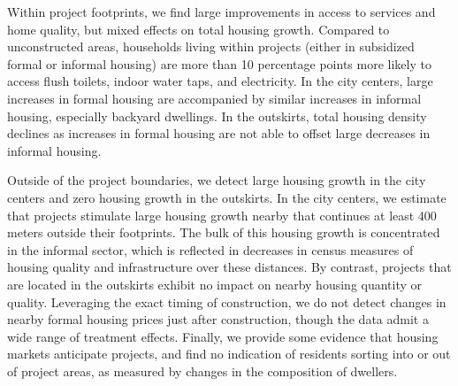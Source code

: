 \documentclass[12pt]{article}
\begin{document}



Within project footprints, we find large improvements in access to services and home quality, but mixed effects on total housing growth. Compared to unconstructed areas, households living within projects (either in subsidized formal or informal housing) are more than 10 percentage points more likely to access flush toilets, indoor water taps, and electricity.  In the city centers, large increases in formal housing are accompanied by similar increases in informal housing, especially backyard dwellings.  In the outskirts, total housing density declines as increases in formal housing are not able to offset large decreases in informal housing.


Outside of the project boundaries, we detect large housing growth in the city centers and zero housing growth in the outskirts.  In the city centers, we estimate that projects stimulate large housing growth nearby that continues at least 400 meters outside their footprints.  The bulk of this housing growth is concentrated in the informal sector, which is reflected in decreases in census measures of housing quality and infrastructure over these distances.  By contrast, projects that are located in the outskirts exhibit no impact on nearby housing quantity or quality.  Leveraging the exact timing of construction, we do not detect changes in nearby formal housing prices just after construction, though the data admit a wide range of treatment effects. Finally, we provide some evidence that housing markets anticipate projects, and find no indication of residents sorting into or out of project areas, as measured by changes in the composition of dwellers. 
\end{document}

